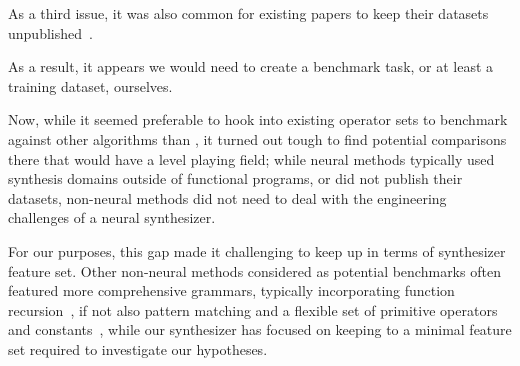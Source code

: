 \documentclass{article}
\begin{document}
As a third issue, it was also common for existing papers to keep their datasets unpublished~\citep{nsps,deepcoder}.

As a result, it appears we would need to create a benchmark task,
or at least a training dataset, ourselves.


Now, while it seemed preferable to hook into existing operator sets to benchmark against other algorithms than \citet{nsps},
it turned out tough to find potential comparisons there that would have a level playing field;
while neural methods typically used synthesis domains outside of functional programs,
or did not publish their datasets,
non-neural methods did not need to deal with the engineering challenges of a neural synthesizer.

For our purposes, this gap made it challenging to keep up in terms of synthesizer feature set.
Other non-neural methods considered as potential benchmarks often featured more comprehensive grammars,
typically incorporating function recursion~\citep{typedmil,myth},
if not also pattern matching and a flexible set of primitive operators and constants~\citep{lambda2},
while our synthesizer has focused on keeping to a minimal feature set required to investigate our hypotheses.

\end{document}

